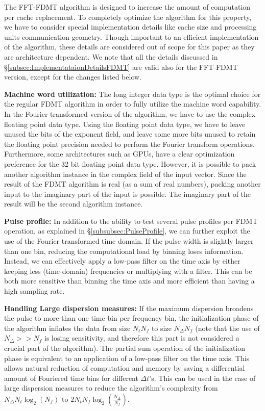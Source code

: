 \documentclass[iop]{emulateapj}
\begin{document}
The FFT-FDMT algorithm is designed to increase the amount of computation per cache replacement. To completely optimize the algorithm for this property, we have to consider special implementation details like cache size and processing units communication geometry. Though important to an efficient implementation of the algorithm, these details are considered out of scope for this paper as they are architecture dependent.
We note that all the details discussed in \S \ref{subsec:ImplementataionDetailsFDMT} are valid also for the FFT-FDMT version, except for the changes listed below.

{\bf Machine word utilization:}
The long integer data type is the optimal choice for the regular FDMT algorithm in order to fully utilize the machine word capability. In the Fourier transformed version of the algorithm, we have to use the complex floating point data type.
Using the floating point data type, we have to leave unused the bits of the exponent field, and leave some more bits unused to retain the floating point precision needed to perform the Fourier transform operations.  
Furthermore, some architectures such as GPUs, have a clear optimization preference for the 32 bit floating point data type.
However, it is possible to pack another algorithm instance in the complex field of the input vector. Since the result of the FDMT algorithm is real (as a sum of real numbers), packing another input to the imaginary part of the input is possible. The imaginary part of the result will be the second algorithm instance.

{\bf Pulse profile:} \label{subsec:FDMTFFTPulseProfile}
In addition to the ability to test several pulse profiles per FDMT operation, as explained in \S \ref{subsubsec:PulseProfile}, we can further exploit the use of the Fourier transformed time domain. 
If the pulse width is slightly larger than one bin, reducing the computational load by binning loses information.
Instead, we can effectively apply a low-pass filter on the time axis by either keeping less (time-domain) frequencies or multiplying with a filter. This can be both more sensitive than binning the time axis and more efficient than having a high sampling rate.

{\bf Handling Large dispersion measures:}
If the maximum dispersion broadens the pulse to more than one time bin per frequency bin, the initialization phase of the algorithm inflates the data from size $N_tN_f$ to size $N_\Delta N_f$ (note that the use of $N_\Delta >> N_f$ is losing sensitivity, and therefore this part is not considered a crucial part of the algorithm). The partial sum operation of the initialization phase is equivalent to an application of a low-pass filter on the time axis. This allows natural reduction of computation and memory by saving a differential amount of Fouriered time bins for different $\Delta t$'s. This can be used in the case of large dispersion measures to reduce the algorithm's complexity from $N_\Delta N_t\log_2(N_f)$ to $2N_tN_f\log_2(\frac{N_\Delta}{N_f})$.   
\end{document}
